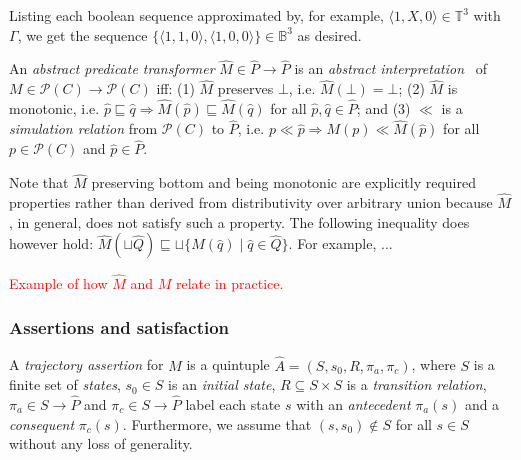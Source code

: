 \noindent Listing each boolean sequence approximated by, for example, $\langle 1,X,0  \rangle \in \mathbb{T}^{3}$ with $\Gamma$, we get the sequence $\{ \langle 1,1,0 \rangle, \langle 1,0,0 \rangle \} \in \mathbb{B}^{3}$ as desired.


An \textit{abstract predicate transformer} $\hat M \in \hat P \rightarrow \hat P$ is an \textit{abstract interpretation}~\cite{cousot1996} of $M \in \mathcal{P}(C) \rightarrow \mathcal{P}(C)$ iff: (1) $\hat M$ preserves $\bot$, i.e. $\hat M(\bot) = \bot$; (2) $\hat M$ is monotonic, i.e. $\hat p \sqsubseteq \hat q \Rightarrow \hat M (\hat p) \sqsubseteq \hat M (\hat q)$ for all $\hat p, \hat q \in \hat P$; and (3) $\ll$ is a \textit{simulation relation} from $\mathcal{P}(C)$ to $\hat P$, i.e. $p \ll \hat p \Rightarrow M (p) \ll \hat M (\hat p)$ for all $p \in \mathcal{P}(C)$ and $\hat p \in \hat P$.

Note that $\hat M$ preserving bottom and being monotonic are explicitly required properties rather than derived from distributivity over arbitrary union because $\hat M$, in general, does not satisfy such a property. The following inequality does however hold: $\hat M(\sqcup \hat Q) \sqsubseteq \sqcup \{ \hat M(\hat q) \mid \hat q \in \hat Q \}$. For example, ...



\textcolor{red}{Example of how $\hat M$ and $M$ relate in practice.}

\subsubsection{Assertions and satisfaction}

A \textit{trajectory assertion} for $\hat M$ is a quintuple $\hat A = (S,s_{0},R,\pi_{a},\pi_{c})$, where $S$ is a finite set of \textit{states}, $s_{0} \in S$ is an \textit{initial state}, $R \subseteq S \times S$ is a \textit{transition relation}, $\pi_{a} \in S \rightarrow \hat P$ and $\pi_{c} \in S \rightarrow \hat P$ label each state $s$ with an \textit{antecedent} $\pi_{a}(s)$ and a \textit{consequent} $\pi_{c}(s)$. Furthermore, we assume that $(s,s_{0}) \notin S$ for all $s \in S$ without any loss of generality.

